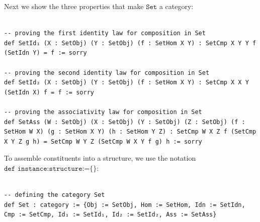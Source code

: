 \documentclass{book}
\newcounter{lcounter}
\begin{document}
Next we show the three properties that make $\texttt{Set}$ a category:

\begin{center}
\begin{tcolorbox}[width=5in,colback={white},title={\begin{center}\texttt{Lean \thelcounter} \addtocounter{lcounter}{1}  \end{center}},colbacktitle=Blue,coltitle=black]
\begin{verbatim}

-- proving the first identity law for composition in Set
def SetId₁ (X : SetObj) (Y : SetObj) (f : SetHom X Y) : SetCmp X Y Y f (SetIdn Y) = f := sorry

-- proving the second identity law for composition in Set
def SetId₂ (X : SetObj) (Y : SetObj) (f : SetHom X Y) : SetCmp X X Y (SetIdn X) f = f := sorry

-- proving the associativity law for composition in Set
def SetAss (W : SetObj) (X : SetObj) (Y : SetObj) (Z : SetObj) (f : SetHom W X) (g : SetHom X Y) (h : SetHom Y Z) : SetCmp W X Z f (SetCmp X Y Z g h) = SetCmp W Y Z (SetCmp W X Y f g) h := sorry

\end{verbatim}%
\end{tcolorbox}
\end{center}

To assemble constituents into a structure, we use the notation $\texttt{def instance:structure:=} \{ \}$:\\

\begin{center}
\begin{tcolorbox}[width=5in,colback={white},title={\begin{center}\texttt{Lean \thelcounter} \addtocounter{lcounter}{1}  \end{center}},colbacktitle=Blue,coltitle=black]
\begin{verbatim}

-- defining the category Set
def Set : category := {Obj := SetObj, Hom := SetHom, Idn := SetIdn, Cmp := SetCmp, Id₁ := SetId₁, Id₂ := SetId₂, Ass := SetAss}

\end{verbatim}%
\end{tcolorbox}
\end{center}
\end{document}

